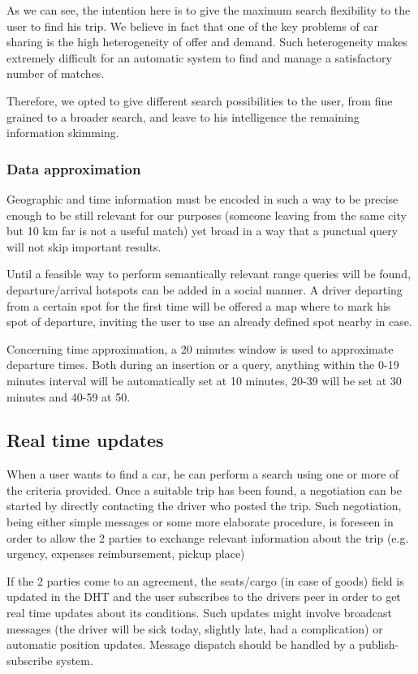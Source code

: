 	
As we can see, the intention here is to give the maximum search flexibility to the user to find his trip.
We believe in fact that one of the key problems of car sharing is the high heterogeneity of offer and demand.
Such heterogeneity makes extremely difficult for an automatic system to find and manage a satisfactory number of matches.

Therefore, we opted to give different search possibilities to the user, from fine grained to a broader search, and leave to
his intelligence the remaining information skimming.


\subsubsection{Data approximation}
Geographic and time information must be encoded in such a way to be precise enough to be 
still relevant for our purposes (someone leaving from the same city but 10 km far is not a useful match)
yet broad in a way that a punctual query will not skip important results.

Until a feasible way to perform semantically relevant range queries will be found, departure/arrival hotspots
can be added in a social manner. A driver departing from a certain spot for the first time will be offered a map 
where to mark his spot of departure, inviting the user to use an already defined spot nearby in case.

Concerning time approximation, a 20 minutes window is used to approximate departure times. Both
during an insertion or a query, anything within the 0-19 minutes interval will be automatically 
set at 10 minutes, 20-39 will be set at 30 minutes and 40-59 at 50.

\subsection{Real time updates}
When a user wants to find a car, he can perform a search using one or more of the criteria provided.
Once a suitable trip has been found, a negotiation can be started by directly contacting the driver who 
posted the trip. Such negotiation, being either simple messages or some more elaborate
procedure, is foreseen in order to allow the 2 parties to exchange relevant information about the trip
(e.g. urgency, expenses reimbursement, pickup place)

If the 2 parties come to an agreement, the seats/cargo (in case of goods) field is updated in the DHT
and the user subscribes to the drivers peer in order to get real time updates about its conditions.
Such updates might involve broadcast messages (the driver will be sick today, slightly late, had a complication)
or automatic position updates. Message dispatch should be handled by a publish-subscribe system.

